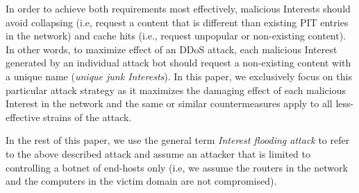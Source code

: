In order to achieve both requirements most effectively, malicious Interests should avoid collapsing (i.e, request a content that is different than existing PIT entries in the network) and cache hits (i.e., request unpopular or non-existing content). In other words, to maximize effect of an DDoS attack, each malicious Interest generated by an individual attack bot should request a non-existing content with a unique name (\emph{unique junk Interests}). In this paper, we exclusively focus on this particular attack strategy as it maximizes the damaging effect of each malicious Interest in the network and the same or similar countermeasures apply to all less-effective strains of the attack. 

In the rest of this paper, we use the general term \emph{Interest flooding attack} to refer to the above described attack and assume an attacker that is limited to controlling a botnet of end-hosts only (i.e, we assume the routers in the network and the computers in the victim domain are not compromised).






